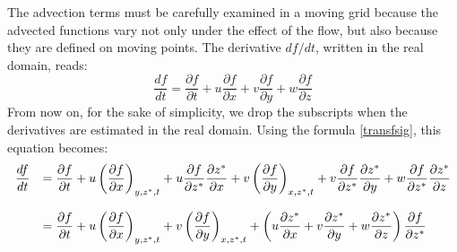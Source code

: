 The advection terms must be carefully examined in a moving grid because the
advected functions vary not only under the effect of the flow, but also
because they are defined on moving points. The derivative $df/dt$,
written in the real domain, reads:%
\begin{equation}
\dfrac{df}{dt}=\dfrac{\partial f}{\partial t}
+u\dfrac{\partial f}{\partial x}
+v\dfrac{\partial f}{\partial y}
+w\dfrac{\partial f}{\partial z} \label{ugrad}%
\end{equation}
From now on, for the sake of simplicity, we drop the subscripts when the derivatives are estimated in the real domain.
Using the formula \eqref{transfsig}, this equation becomes:
\begin{equation}\label{formulaTimeDeriv}
\begin{array}{lll}
\dfrac{df}{dt} & = \dfrac{\partial f}{\partial t}
+u\left(\dfrac{\partial f}{\partial x}\right)_{y,z^*,t}
+u\dfrac{\partial f}{\partial z^{\ast}}\dfrac{\partial z^{\ast}}{\partial x}
+v\left(\dfrac{\partial f}{\partial y}\right)_{x,z^*,t}
+v\dfrac{\partial f}{\partial z^{\ast}}\dfrac{\partial z^{\ast}}{\partial y}
+w\dfrac{\partial f}{\partial z^{\ast}}\dfrac{\partial z^{\ast}}{\partial z}\bigskip\\
&=\dfrac{\partial f}{\partial t}+u\left(\dfrac{\partial f}{\partial x}\right)_{y,z^*,t}
+v\left(\dfrac{\partial f}{\partial y}\right)_{x,z^*,t}
+\left(u\dfrac{\partial z^{\ast}}{\partial x}
+v\dfrac{\partial z^{\ast}}{\partial y}
+w\dfrac{\partial z^{\ast}}{\partial z}\right)\dfrac{\partial f}{\partial z^{\ast}}
\end{array}
\end{equation}


